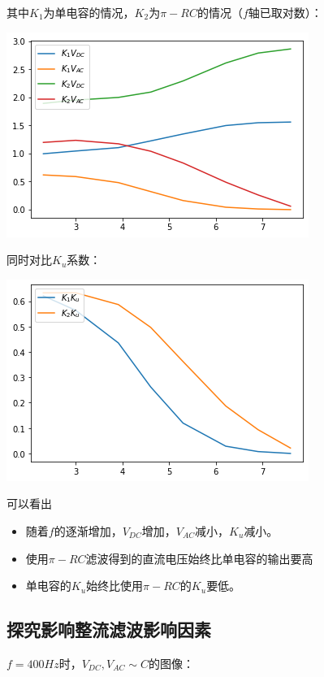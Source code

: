 \documentclass[a4paper]{ltxdoc}
\newenvironment{Figure}
{\par\medskip\noindent\minipage{\linewidth}}
{\endminipage\par\medskip}
\begin{document}
\begin{multicols}{2}
    其中$K_1$为单电容的情况，$K_2$为$\pi -RC$的情况（$f$轴已取对数）：
    \begin{Figure}
        \centering
        \includegraphics[width=0.8\linewidth]{img/6.png}
    \end{Figure}

    \noindent
    同时对比$K_u$系数：
    \begin{Figure}
        \centering
        \includegraphics[width=0.8\linewidth]{img/7.png}
    \end{Figure}

    \noindent
    可以看出
    \begin{itemize}
        \item 随着$f$的逐渐增加，$V_{DC}$增加，$V_{AC}$减小，$K_u$减小。
        \item 使用$\pi -RC$滤波得到的直流电压始终比单电容的输出要高
        \item 单电容的$K_u$始终比使用$\pi-RC$的$K_u$要低。
    \end{itemize}

    \subsection{探究影响整流滤波影响因素}
    \noindent
    $f = 400 Hz$时，$V_{DC},V_{AC} \sim C$的图像：


\end{multicols}
\end{document}
